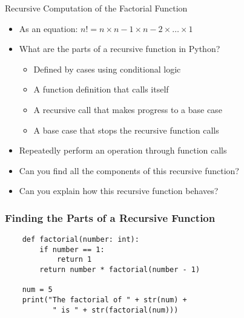 \documentclass[14pt,aspectratio=169]{beamer}
\begin{document}
%
\begin{frame}{Recursive Computation of the Factorial Function}
  \begin{itemize}
    \item As an equation: $n! = n \times n-1 \times n-2 \times \ldots \times 1$
      \vspace*{-.15in}
    \item What are the parts of a recursive function in Python?
      \begin{itemize}
        \item Defined by cases using conditional logic
        \item A function definition that calls itself
        \item A recursive call that makes progress to a base case
        \item A base case that stops the recursive function calls
      \end{itemize}
      \vspace*{-.2in}
    \item Repeatedly perform an operation through function calls
      \vspace*{-.2in}
    \item Can you find all the components of this recursive function?
      \vspace*{-.4in}
    \item Can you explain how this recursive function behaves?
  \end{itemize}
\end{frame}

%
\begin{frame}[fragile]
  \frametitle{Finding the Parts of a Recursive Function}
  \hspace*{-.8in}
  \begin{minipage}{6in}
    \begin{verbatim}
    def factorial(number: int):
        if number == 1:
            return 1
        return number * factorial(number - 1)

    num = 5
    print("The factorial of " + str(num) +
           " is " + str(factorial(num)))
    \end{verbatim}
  \end{minipage}
  \vspace*{.05in}
\end{frame}
\end{document}

